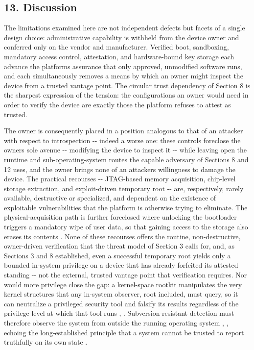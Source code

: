 \documentclass[
]{article}
\begin{document}
\subsection{13. Discussion}\label{discussion}

The limitations examined here are not independent defects but facets of
a single design choice: administrative capability is withheld from the
device owner and conferred only on the vendor and manufacturer. Verified
boot, sandboxing, mandatory access control, attestation, and
hardware-bound key storage each advance the platform\textquotesingle s
assurance that only approved, unmodified software runs, and each
simultaneously removes a means by which an owner might inspect the
device from a trusted vantage point. The circular trust dependency of
Section 8 is the sharpest expression of the tension: the configurations
an owner would need in order to verify the device are exactly those the
platform refuses to attest as trusted.

The owner is consequently placed in a position analogous to that of an
attacker with respect to introspection -\/- indeed a worse one: these
controls foreclose the owner\textquotesingle s sole avenue -\/-
modifying the device to inspect it -\/- while leaving open the runtime
and sub-operating-system routes the capable adversary of Sections 8 and
12 uses, and the owner brings none of an attacker\textquotesingle s
willingness to damage the device. The practical recourses -\/-
JTAG-based memory acquisition, chip-level storage extraction, and
exploit-driven temporary root -\/- are, respectively, rarely available,
destructive or specialized, and dependent on the existence of
exploitable vulnerabilities that the platform is otherwise trying to
eliminate. The physical-acquisition path is further foreclosed where
unlocking the bootloader triggers a mandatory wipe of user data, so that
gaining access to the storage also erases its contents
\citep{aosp-bootloader-locking}. None of these recourses offers the
routine, non-destructive, owner-driven verification that the threat
model of Section 3 calls for, and, as Sections 3 and 8 established, even
a successful temporary root yields only a bounded in-system privilege on
a device that has already forfeited its attested standing -\/- not the
external, trusted vantage point that verification requires. Nor would
more privilege close the gap: a kernel-space rootkit manipulates the
very kernel structures that any in-system observer, root included, must
query, so it can neutralize a privileged security tool and falsify its
results regardless of the privilege level at which that tool runs
\citep{guri-joker-jtag}, \citep{bickford-rootkits-smartphones}.
Subversion-resistant detection must therefore observe the system from
outside the running operating system \citep{guri-joker-jtag},
\citep{garfinkel-vmi}, echoing the long-established principle that a
system cannot be trusted to report truthfully on its own state
\citep{thompson-trusting-trust}.
\end{document}
